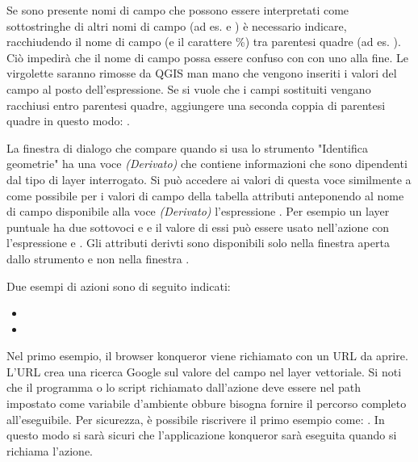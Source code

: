 Se sono presente nomi di campo che possono essere interpretati come
sottostringhe di altri nomi di campo (ad es.  e
) è necessario indicare, racchiudendo il nome di campo (e il
carattere \%) tra parentesi quadre (ad es. \usertext{[\%col10]}). Ciò impedirà
che il nome di campo  possa essere confuso con
 con uno  alla fine. Le virgolette saranno
rimosse da QGIS man mano che vengono inseriti i valori del campo al posto
dell'espressione. Se si vuole che i campi sostituiti vengano racchiusi entro
parentesi quadre, aggiungere una seconda coppia di parentesi quadre in questo
modo: \usertext{[[\%col10]]}.

La finestra di dialogo  che compare quando si
usa lo strumento "Identifica geometrie" ha una voce {\em (Derivato)} che
contiene informazioni che sono dipendenti dal tipo di layer interrogato. Si
può accedere ai valori di questa voce similmente a come possibile per i valori
di campo della tabella attributi anteponendo al nome di campo disponibile alla
voce {\em (Derivato)} l'espressione . Per esempio un
layer puntuale ha due sottovoci  e  e il valore di
essi può essere usato nell'azione con l'espressione 
e . Gli attributi derivti sono disponibili solo nella
finestra   aperta dallo strumento  e non nella finestra .

Due esempi di azioni sono di seguito indicati:

\begin{itemize}
  \item {}
  \item {}
\end{itemize}

Nel primo esempio, il browser konqueror viene richiamato con un URL da
aprire. L'URL crea una ricerca Google sul valore del campo  nel
layer vettoriale. Si noti che il programma o lo script richiamato dall'azione
deve essere nel path impostato come variabile d'ambiente obbure bisogna
fornire il percorso completo all'eseguibile. Per sicurezza, è possibile
riscrivere il primo esempio come: . In questo modo si sarà sicuri che
l'applicazione konqueror sarà eseguita quando si richiama l'azione.

